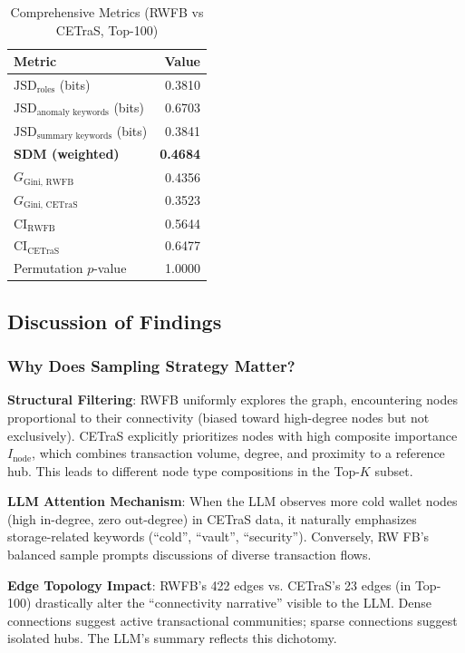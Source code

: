 \begin{table}[!t]
\centering
\caption{Comprehensive Metrics (RWFB vs CETraS, Top-100)}
\label{tab:all-metrics}
\begin{tabular}{l r}
\toprule
Metric & Value \\
\midrule
$\text{JSD}_{\text{roles}}$ (bits) & 0.3810 \\
$\text{JSD}_{\text{anomaly keywords}}$ (bits) & 0.6703 \\
$\text{JSD}_{\text{summary keywords}}$ (bits) & 0.3841 \\
\textbf{SDM (weighted)} & \textbf{0.4684} \\
\midrule
$G_{\text{Gini, RWFB}}$ & 0.4356 \\
$G_{\text{Gini, CETraS}}$ & 0.3523 \\
$\text{CI}_{\text{RWFB}}$ & 0.5644 \\
$\text{CI}_{\text{CETraS}}$ & 0.6477 \\
\midrule
Permutation $p$-value & 1.0000 \\
\bottomrule
\end{tabular}
\end{table}

\subsection{Discussion of Findings}

\subsubsection{Why Does Sampling Strategy Matter?}

\textbf{Structural Filtering}: RWFB uniformly explores the graph, encountering nodes proportional to their connectivity (biased toward high-degree nodes but not exclusively). CETraS explicitly prioritizes nodes with high composite importance $I_{\text{node}}$, which combines transaction volume, degree, and proximity to a reference hub. This leads to different node type compositions in the Top-$K$ subset.

\textbf{LLM Attention Mechanism}: When the LLM observes more cold wallet nodes (high in-degree, zero out-degree) in CETraS data, it naturally emphasizes storage-related keywords (``cold'', ``vault'', ``security''). Conversely, RW FB's balanced sample prompts discussions of diverse transaction flows.

\textbf{Edge Topology Impact}: RWFB's 422 edges vs. CETraS's 23 edges (in Top-100) drastically alter the ``connectivity narrative'' visible to the LLM. Dense connections suggest active transactional communities; sparse connections suggest isolated hubs. The LLM's summary reflects this dichotomy.

